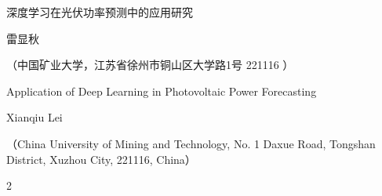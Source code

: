 



\begin{center}
\vspace*{12pt}
{\cnTitleStyle 深度学习在光伏功率预测中的应用研究\par}
\vspace{12pt}
{\cnAuthorStyle 雷显秋\par}
\vspace{6pt}
{\cnAffilStyle （中国矿业大学，江苏省徐州市铜山区大学路1号 221116 ）\par}
\vspace{3pt}
\vspace{12pt}

{\enTitleStyle Application of Deep Learning in Photovoltaic Power Forecasting\par}
\vspace{6pt}
{\enAuthorStyle Xianqiu Lei \par}
\vspace{3pt}
{\enAffilStyle （China University of Mining and Technology, No. 1 Daxue Road, Tongshan District, Xuzhou City, 221116, China）\par}
\vspace{12pt}
\end{center}

\begin{multicols}{2}

\maintextstyle







\end{multicols}

\clearpage



